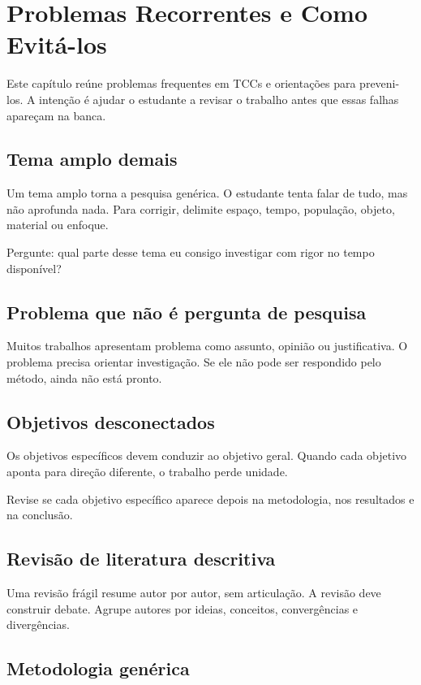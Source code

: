 \chapter{Problemas Recorrentes e Como Evitá-los}

Este capítulo reúne problemas frequentes em TCCs e orientações para preveni-los. A intenção é ajudar o estudante a revisar o trabalho antes que essas falhas apareçam na banca.

\section{Tema amplo demais}

Um tema amplo torna a pesquisa genérica. O estudante tenta falar de tudo, mas não aprofunda nada. Para corrigir, delimite espaço, tempo, população, objeto, material ou enfoque.

Pergunte: qual parte desse tema eu consigo investigar com rigor no tempo disponível?

\section{Problema que não é pergunta de pesquisa}

Muitos trabalhos apresentam problema como assunto, opinião ou justificativa. O problema precisa orientar investigação. Se ele não pode ser respondido pelo método, ainda não está pronto.

\section{Objetivos desconectados}

Os objetivos específicos devem conduzir ao objetivo geral. Quando cada objetivo aponta para direção diferente, o trabalho perde unidade.

Revise se cada objetivo específico aparece depois na metodologia, nos resultados e na conclusão.

\section{Revisão de literatura descritiva}

Uma revisão frágil resume autor por autor, sem articulação. A revisão deve construir debate. Agrupe autores por ideias, conceitos, convergências e divergências.

\section{Metodologia genérica}

